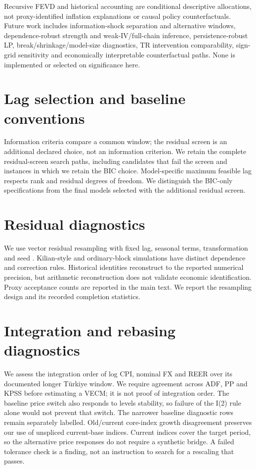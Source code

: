 Recursive FEVD and historical accounting are conditional descriptive allocations, not proxy-identified inflation explanations or causal policy counterfactuals. Future work includes information-shock separation and alternative windows, dependence-robust strength and weak-IV/full-chain inference, persistence-robust LP, break/shrinkage/model-size diagnostics, TR intervention comparability, sign-grid sensitivity and economically interpretable counterfactual paths. None is implemented or selected on significance here.

\clearpage
\appendix
\begingroup\small
\renewcommand{\arraystretch}{1.0}
\setlength{\parskip}{3pt}

\section{Lag selection and baseline conventions}

Information criteria compare a common window; the residual screen is an additional declared choice, not an information criterion. We retain the complete residual-screen search paths, including candidates that fail the screen and instances in which we retain the BIC choice. Model-specific maximum feasible lag respects rank and residual degrees of freedom. We distinguish the BIC-only specifications from the final models selected with the additional residual screen.
\section{Residual diagnostics}

We use vector residual resampling with fixed lag, seasonal terms, transformation and seed \Seed{}. Kilian-style and ordinary-block simulations have distinct dependence and correction rules. Historical identities reconstruct to the reported numerical precision, but arithmetic reconstruction does not validate economic identification. Proxy acceptance counts are reported in the main text. We report the resampling design and its recorded completion statistics.
\section{Integration and rebasing diagnostics}

We assess the integration order of log CPI, nominal FX and REER over its documented longer Türkiye window. We require agreement across ADF, PP and KPSS before estimating a VECM; it is not proof of integration order. The baseline price switch also responds to levels stability, so failure of the I(2) rule alone would not prevent that switch. The narrower baseline diagnostic rows remain separately labelled.
Old/current core-index growth disagreement preserves our use of unspliced current-base indices. Current indices cover the target period, so the alternative price responses do not require a synthetic bridge. A failed tolerance check is a finding, not an instruction to search for a rescaling that passes.
\endgroup
